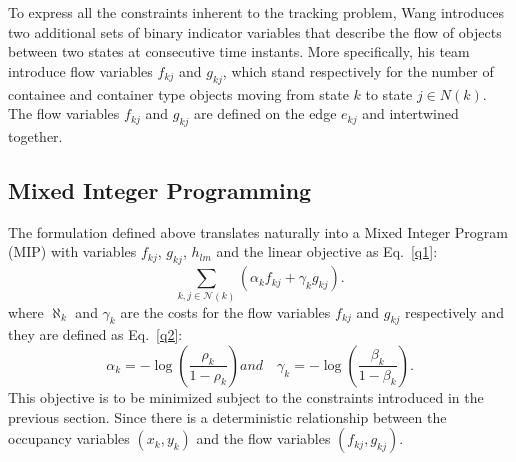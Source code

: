 \documentclass[10pt,twocolumn,letterpaper]{article}
\begin{document}
To express all the constraints inherent to the tracking problem, Wang introduces two additional sets of binary indicator variables that describe the flow of objects between two states at consecutive time instants. More specifically, his team introduce flow variables $f_{kj}$ and $g_{kj}$, which stand respectively for the number of containee and container type objects moving from state $k$ to state $j\in N(k)$. The flow variables $f_{kj}$ and $g_{kj}$ are defined on the edge $e_{kj}$ and intertwined together.

\subsection{Mixed Integer Programming}

The formulation defined above translates naturally into a Mixed Integer Program (MIP) with variables $f_{kj}$, $g_{kj}$, $h_{lm}$ and the linear objective as Eq.~\ref{q1}:
\begin{equation}
\sum_{k,j\in \mathcal{N}(k)}(\alpha_k f_{kj}+\gamma_k g_{kj}).   \label{q1}
\end{equation}
where $\aleph_k$ and $\gamma_k$ are the costs for the flow variables $f_{kj}$ and $g_{kj}$ respectively and they are defined as Eq.~\ref{q2}:
\begin{equation}
\alpha_k=-\log(\frac{\rho_k}{1-\rho_k}) and\quad \gamma_k=-\log(\frac{\beta_k}{1-\beta_k}).   \label{q2}
\end{equation}
This objective is to be minimized subject to the constraints introduced in the previous section. Since there is a deterministic relationship between the occupancy variables $(x_k,y_k)$ and the flow variables $(f_{kj}, g_{kj})$.
\end{document}
